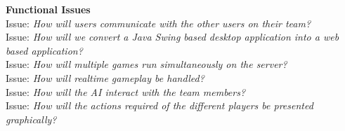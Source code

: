 \textbf{Functional Issues}
\\
Issue: \textit{How will users communicate with the other users on their team?}
\\

Issue: \textit{How will we convert a Java Swing based desktop application into a web based application?}
\\

Issue: \textit{How will multiple games run simultaneously on the server?}
\\

Issue: \textit{How will realtime gameplay be handled?}
\\

Issue: \textit{How will the AI interact with the team members?}
\\

Issue: \textit{How will the actions required of the different players be presented graphically?}
\\
